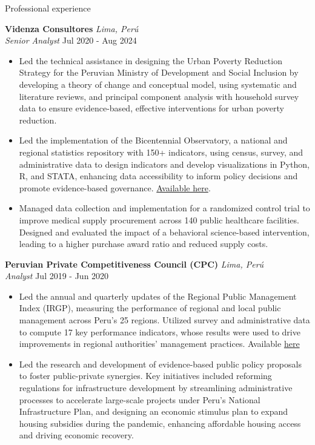 \documentclass{resume} %
\begin{document}
\begin{rSection}{Professional experience}

\textbf{Videnza Consultores} \hfill \textit{Lima, Perú} \\
\textit{Senior Analyst}  \hfill Jul 2020 - Aug 2024
 \begin{itemize}
    \itemsep -3pt {} 
      \item Led the technical assistance in designing the Urban Poverty Reduction Strategy for the Peruvian Ministry of Development and Social Inclusion by developing a theory of change and conceptual model, using systematic and literature reviews, and principal component analysis with household survey data to ensure evidence-based, effective interventions for urban poverty reduction.
      \item Led the implementation of the Bicentennial Observatory, a national and regional statistics repository with 150+ indicators, using census, survey, and administrative data to design indicators and develop visualizations in Python, R, and STATA, enhancing data accessibility to inform policy decisions and promote evidence-based governance. \href{https://propuestasdelbicentenario.pe/observatorio/}{Available here}.
      \item Managed data collection and implementation for a randomized control trial to improve medical supply procurement across 140 public healthcare facilities. Designed and evaluated the impact of a behavioral science-based intervention, leading to a higher purchase award ratio and reduced supply costs.
   \end{itemize}
 
 \textbf{Peruvian Private Competitiveness Council (CPC)} \hfill \textit{Lima, Perú}\\
\textit{Analyst} \hfill Jul 2019 - Jun 2020
 \begin{itemize}
    \itemsep -3pt {} 
      \item Led the annual and quarterly updates of the Regional Public Management Index (IRGP), measuring the performance of regional and local public management across Peru’s 25 regions. Utilized survey and administrative data to compute 17 key performance indicators, whose results were used to drive improvements in regional authorities’ management practices. Available \href{https://www.compite.pe/wp-content/uploads/2020/07/IRGP-2020-version-final.pdf}{here}
      \item Led the research and development of evidence-based public policy proposals to foster public-private synergies. Key initiatives included reforming regulations for infrastructure development by streamlining administrative processes to accelerate large-scale projects under Peru's National Infrastructure Plan, and designing an economic stimulus plan to expand housing subsidies during the pandemic, enhancing affordable housing access and driving economic recovery.
 \end{itemize}


\end{rSection}
\end{document}
